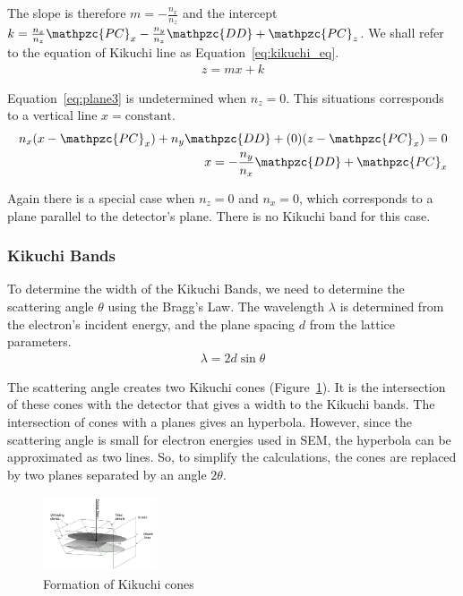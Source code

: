 \documentclass[letterpaper]{article}
\newcommand{\var}[1]{\mathpzc{#1}}
\begin{document}
	The slope is therefore $m=-\frac{n_x}{n_z}$ and the intercept $k=\frac{n_x}{n_z}\var{PC}_x - \frac{n_y}{n_z}\var{DD} + \var{PC}_z$. We shall refer to the equation of Kikuchi line as Equation~\ref{eq:kikuchi_eq}.
	\begin{eqnarray}
		z = mx + k
		\label{eq:kikuchi_eq}
	\end{eqnarray}

	Equation~\ref{eq:plane3} is undetermined when $n_z = 0$. 
	This situations corresponds to a vertical line $x = \text{constant}$.
	\begin{eqnarray}
		n_x (x - \var{PC}_x) + n_y \var{DD} + (0) (z - \var{PC}_x) = 0 \\\nonumber
		x = -\frac{n_y}{n_x}\var{DD} + \var{PC}_x
		\label{eq:plane4}
	\end{eqnarray}
	
	Again there is a special case when $n_z = 0$ and $n_x = 0$, which corresponds to a plane parallel to the detector's plane. 
	There is no Kikuchi band for this case.
	
	\subsubsection{Kikuchi Bands}
	To determine the width of the Kikuchi Bands, we need to determine the scattering angle $\theta$ using the Bragg's Law. The wavelength $\lambda$ is determined from the electron's incident energy, and the plane spacing $d$ from the lattice parameters.
	\begin{eqnarray}
		\lambda = 2d\sin\theta
		\label{eq:bragg}
	\end{eqnarray}
	
	
	The scattering angle creates two Kikuchi cones (Figure~\ref{fig:ebsd_formation}). 
	It is the intersection of these cones with the detector that gives a width to the Kikuchi bands.
	The intersection of cones with a planes gives an hyperbola. 
	However, since the scattering angle is small for electron energies used in SEM, the hyperbola can be approximated as two lines. 
	So, to simplify the calculations, the cones are replaced by two planes separated by an angle $2\theta$.
	
	\begin{figure}
		\centering
		\includegraphics[width=0.3\textwidth]{figures/ebsd_formation}
		\caption{Formation of Kikuchi cones\cite{http://level2.phys.strath.ac.uk/ssd/HTML/charhtml/ebsd.htm}}
		\label{fig:ebsd_formation}
	\end{figure}
	
\end{document}
